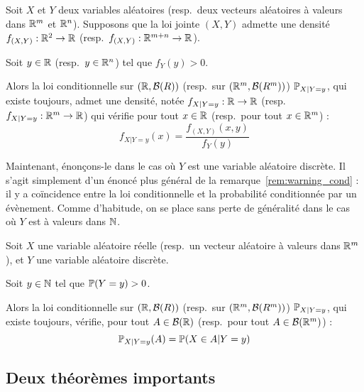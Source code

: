 \documentclass[../integ-proba.tex]{subfiles}
\begin{document}
    \begin{thm}
        Soit $X$ et $Y$ deux variables aléatoires (resp.\ deux vecteurs aléatoires à valeurs dans $\mathbb{R}^m$ et $\mathbb{R}^n$).
        Supposons que la loi jointe $\left( X, Y \right)$ admette une densité $f_{\left( X, Y \right)}: \mathbb{R}^2 \rightarrow \mathbb{R}$ (resp.\ $f_{\left( X, Y \right)}: \mathbb{R}^{m+n} \rightarrow \mathbb{R}$).

        Soit $y \in \mathbb{R}$ (resp.\ $y \in \mathbb{R}^n$) tel que $f_Y(y) > 0$.

        Alors la loi conditionnelle sur $\left( \mathbb{R}, \mathcal{B}(R) \right)$ (resp.\ sur $\left( \mathbb{R}^m, \mathcal{B}(R^m) \right)$) $\mathbb{P}_{X | Y = y}$, qui existe toujours, admet une densité, notée $f_{X | Y=y} : \mathbb{R} \rightarrow \mathbb{R}$ (resp.\ $f_{X | Y=y} : \mathbb{R}^m \rightarrow \mathbb{R}$) qui vérifie pour tout $x \in \mathbb{R}$ (resp.\ pour tout $x \in \mathbb{R}^m$) :
        \begin{displaymath}
            f_{X | Y = y}(x) = \dfrac{f_{\left( X, Y \right)}(x,y)}{f_Y(y)}
        \end{displaymath}
    \end{thm}

    Maintenant, énonçons-le dans le cas où $Y$ est une variable aléatoire discrète.
    Il s'agit simplement d'un énoncé plus général de la remarque~\ref{rem:warning_cond} : il y a coïncidence entre la loi conditionnelle et la probabilité conditionnée par un évènement.
    Comme d'habitude, on se place sans perte de généralité dans le cas où $Y$ est à valeurs dans $\mathbb{N}$.

    \begin{thm}
        Soit $X$ une variable aléatoire réelle (resp.\ un vecteur aléatoire à valeurs dans $\mathbb{R}^m$), et $Y$ une variable aléatoire discrète.

        Soit $y \in \mathbb{N}$ tel que $\mathbb{P}(Y = y) > 0$.

        Alors la loi conditionnelle sur $\left( \mathbb{R}, \mathcal{B}(R) \right)$ (resp.\ sur $\left( \mathbb{R}^m, \mathcal{B}(R^m) \right)$) $\mathbb{P}_{X | Y = y}$, qui existe toujours, vérifie, pour tout $A \in \mathcal{B}(\mathbb{R})$ (resp.\ pour tout $A \in \mathcal{B}(\mathbb{R}^m)$) :
        \begin{displaymath}
            \mathbb{P}_{X | Y = y}(A) = \mathbb{P}(X \in A | Y = y)
        \end{displaymath}
    \end{thm}

    \subsection{Deux théorèmes importants}
\end{document}
